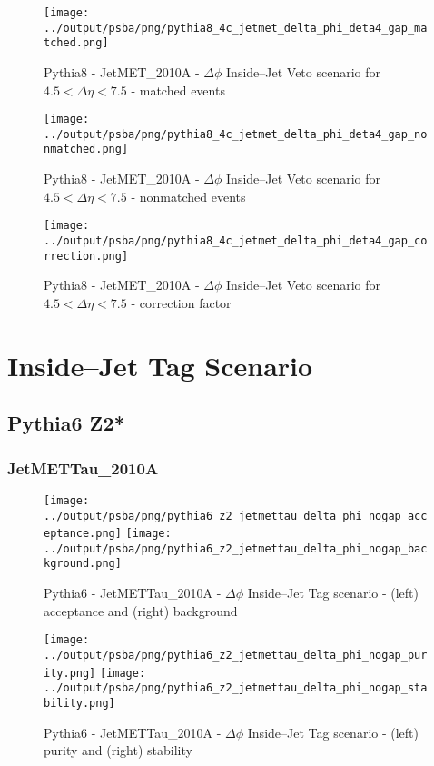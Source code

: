 \documentclass[11pt]{book}
\begin{document}
\begin{figure}[ht]
\centering
\texttt{[image: ../output/psba/png/pythia8\_4c\_jetmet\_delta\_phi\_deta4\_gap\_matched.png]}
\caption{Pythia8 - JetMET\_2010A - $\Delta\phi$ Inside--Jet Veto scenario for $4.5 < \Delta\eta < 7.5$ - matched events}
\label{fig:p8_jetmet_delta_phi_deta4_gap_matched}
\end{figure}

\begin{figure}[ht]
\centering
\texttt{[image: ../output/psba/png/pythia8\_4c\_jetmet\_delta\_phi\_deta4\_gap\_nonmatched.png]}
\caption{Pythia8 - JetMET\_2010A - $\Delta\phi$ Inside--Jet Veto scenario for $4.5 < \Delta\eta < 7.5$ - nonmatched events}
\label{fig:p8_jetmet_delta_phi_deta4_gap_nonmatched}
\end{figure}

\begin{figure}[ht]
\centering
\texttt{[image: ../output/psba/png/pythia8\_4c\_jetmet\_delta\_phi\_deta4\_gap\_correction.png]}
\caption{Pythia8 - JetMET\_2010A - $\Delta\phi$ Inside--Jet Veto scenario for $4.5 < \Delta\eta < 7.5$ - correction factor}
\label{fig:p8_jetmet_delta_phi_deta4_gap_correction}
\end{figure}



\clearpage
\chapter{Inside--Jet Tag Scenario}
\section{Pythia6 Z2*}
\subsection{JetMETTau\_2010A}

\begin{figure}[ht]
\centering
\texttt{[image: ../output/psba/png/pythia6\_z2\_jetmettau\_delta\_phi\_nogap\_acceptance.png]}
\texttt{[image: ../output/psba/png/pythia6\_z2\_jetmettau\_delta\_phi\_nogap\_background.png]}
\caption{Pythia6 - JetMETTau\_2010A - $\Delta\phi$ Inside--Jet Tag scenario - (left) acceptance and (right) background}
\label{fig:p6_jetmettau_delta_phi_nogap_ab}
\end{figure}

\begin{figure}[ht]
\centering
\texttt{[image: ../output/psba/png/pythia6\_z2\_jetmettau\_delta\_phi\_nogap\_purity.png]}
\texttt{[image: ../output/psba/png/pythia6\_z2\_jetmettau\_delta\_phi\_nogap\_stability.png]}
\caption{Pythia6 - JetMETTau\_2010A - $\Delta\phi$ Inside--Jet Tag scenario - (left) purity and (right) stability}
\label{fig:p6_jetmettau_delta_phi_nogap_ps}
\end{figure}
\end{document}
